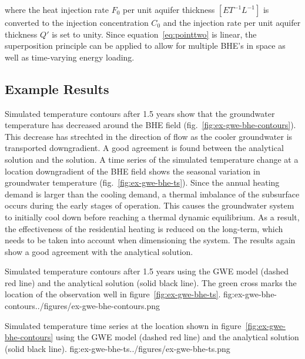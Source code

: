where the heat injection rate $F_0$ per unit aquifer thickness $[ET^{-1}L^{-1}]$ is converted to the injection concentration $C_0$ and the injection rate per unit aquifer thickness $Q'$ is set to unity. Since equation~\ref{eq:pointtwo} is linear, the superposition principle can be applied to allow for multiple BHE's in space as well as time-varying energy loading.

\subsection{Example Results}

Simulated temperature contours after 1.5 years show that the groundwater temperature has decreased around the BHE field (fig.~\ref{fig:ex-gwe-bhe-contours}). This decrease has strechted in the direction of flow as the cooler groundwater is transported downgradient. A good agreement is found between the analytical solution and the \mf solution. A time series of the simulated temperature change at a location downgradient of the BHE field shows the seasonal variation in groundwater temperature (fig.~\ref{fig:ex-gwe-bhe-ts}). Since the annual heating demand is larger than the cooling demand, a thermal imbalance of the subsurface occurs during the early stages of operation. This causes the groundwater system to initially cool down before reaching a thermal dynamic equilibrium. As a result, the effectiveness of the residential heating is reduced on the long-term, which needs to be taken into account when dimensioning the system. The \mf results again show a good agreement with the analytical solution.

\begin{StandardFigure}{
    Simulated temperature contours after 1.5 years using the \mf GWE model (dashed red line) and the analytical solution (solid black line). The green cross marks the location of the observation well in figure~\ref{fig:ex-gwe-bhe-ts}.
    }{fig:ex-gwe-bhe-contours}{../figures/ex-gwe-bhe-contours.png}
\end{StandardFigure}                                 

\begin{StandardFigure}{
    Simulated temperature time series at the location shown in figure~\ref{fig:ex-gwe-bhe-contours} using the \mf GWE model (dashed red line) and the analytical solution (solid black line). 
    }{fig:ex-gwe-bhe-ts}{../figures/ex-gwe-bhe-ts.png}
\end{StandardFigure}    
